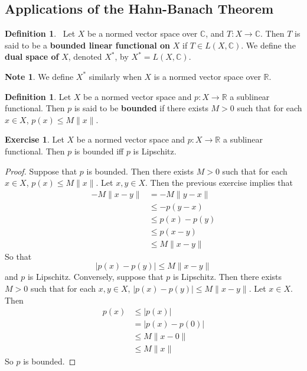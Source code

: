 \documentclass[12pt]{amsart}
\theoremstyle{definition}
\newtheorem{defn}[definition]{Definition}
\newtheorem{note}[definition]{Note}
\newtheorem{ex}[definition]{Exercise}
\newcommand{\C}{\mathbb{C}}
\newcommand{\R}{\mathbb{R}}
\newcommand{\lex}[1]{\label{ex:#1}}
\newcommand{\ld}[1]{\label{defn:#1}}
\begin{document}
	
	
	
	
	
	
	
	
	

	

	\newpage
	\subsection{Applications of the Hahn-Banach Theorem}
	
	
	
	
	
	
	\begin{defn} \ld{55002}\
	Let $X$ be a normed vector space over $\C$, and $T :X \rightarrow \C$. Then $T$ is said to be a \textbf{bounded linear functional on} $X$ if $T \in L(X, \C)$. We define the \textbf{dual space of} $X$, denoted $X^*$, by $X^* = L(X, \C)$.
	\end{defn}
	
	\begin{note}
	We define $X^*$ similarly when $X$ is a normed vector space over $\R$.
	\end{note}

	\begin{defn} \ld{55009}
		Let $X$ be a normed vector space and $p:X \rightarrow \R$ a sublinear functional. Then $p$ is said to be \textbf{bounded} if there exists $M >0$ such that for each $x \in X$, $p(x) \leq M\|x\|$. 
	\end{defn}
	
	\begin{ex} \lex{55010}
		Let $X$ be a normed vector space and $p:X \rightarrow \R$ a sublinear functional. Then $p$ is bounded iff $p$ is Lipschitz. 
	\end{ex}
	
	\begin{proof}
		Suppose that $p$ is bounded. Then there exists $M >0$ such that for each $x \in X$, $p(x) \leq M\|x\|$. Let $x, y \in X$. Then the previous exercise implies that 
		\begin{align*}
			-M\|x-y\| 
			&= -M\|y-x\| \\
			& \leq -p(y-x) \\
			& \leq p(x)-p(y) \\
			& \leq p(x-y) \\
			& \leq M \| x-y\| 
		\end{align*}
		So that $$|p(x) - p(y)| \leq  M\|x-y\|$$
		and $p$ is Lipschitz.
		Conversely, suppose that $p$ is Lipschitz. Then there exists $M >0 $ such that for each $x ,y \in X$, $|p(x) - p(y)| \leq  M\|x-y\|$. Let $x \in X$. Then 
		\begin{align*}
			p(x) 
			& \leq |p(x)| \\
			& = |p(x) - p(0)| \\
			& \leq M\|x - 0\| \\
			& \leq M\|x\| 
		\end{align*}
		So $p$ is bounded.
	\end{proof}
	
\end{document}
